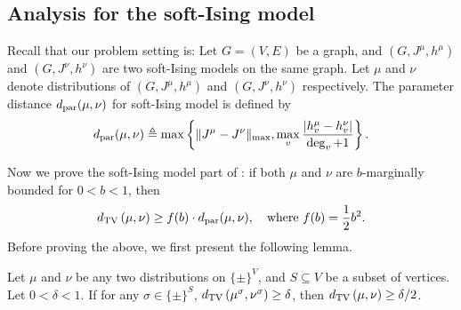 \subsection{Analysis for the soft-Ising model} \label{sec:Ising-proof}

Recall that our problem setting is: Let $G=(V,E)$ be a graph, 
and $(G,J^\mu,h^\mu)$ and $(G,J^\nu,h^\nu)$ are two soft-Ising models on the same graph.
Let $\mu$ and $\nu$ denote distributions of $(G,J^\mu,h^\mu)$ and $(G,J^\nu,h^\nu)$ respectively. 
The parameter distance $d_\mathrm{par}(\mu,\nu)$ for soft-Ising model is defined by 
\[d_\mathrm{par}(\mu,\nu) \triangleq \max\left\{ \Vert J^\mu - J^\nu \Vert_{\max}, \max_v \frac{|h^\mu_v-h^\nu_v|}{\deg_v+1} \right\}.\]

Now we prove the soft-Ising model part of : 
if both $\mu$ and $\nu$ are $b$-marginally bounded for $0<b< 1$, then
\[d_{\mathrm{TV}}\left({\mu},{\nu}\right) \geq f(b) \cdot d_\mathrm{par}(\mu,\nu), 
\quad\text{where } f(b) = \frac{1}{2}b^2.\]
Before proving the above, we first present the following lemma.
\begin{lemma}
\label{lem:local-global-dtv}
Let $\mu$ and $\nu$ be any two distributions on $\{\pm\}^V$, and $S\subseteq V$ be a subset of vertices.
Let $0<\delta<1$. 
If for any $\sigma\in \{\pm\}^S$, $d_{\mathrm{TV}}\left({\mu^\sigma},{\nu^\sigma}\right)\geq \delta$, then $d_{\mathrm{TV}}\left({\mu},{\nu}\right)\geq \delta/2$.
\end{lemma}


